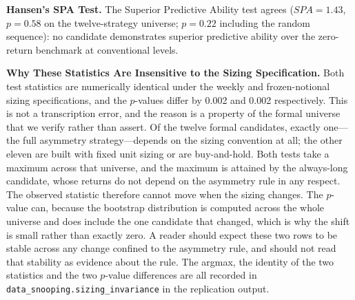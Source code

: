\documentclass[11pt]{article}
\begin{document}
\textbf{Hansen's SPA Test.} The Superior Predictive Ability test \citep{hansen2005test} agrees ($SPA = 1.43$, $p = 0.58$ on the twelve-strategy universe; $p = 0.22$ including the random sequence): no candidate demonstrates superior predictive ability over the zero-return benchmark at conventional levels.

\textbf{Why These Statistics Are Insensitive to the Sizing Specification.} Both test statistics are numerically identical under the weekly and frozen-notional sizing specifications, and the $p$-values differ by 0.002 and 0.002 respectively. This is not a transcription error, and the reason is a property of the formal universe that we verify rather than assert. Of the twelve formal candidates, exactly one---the full asymmetry strategy---depends on the sizing convention at all; the other eleven are built with fixed unit sizing or are buy-and-hold. Both tests take a maximum across that universe, and the maximum is attained by the always-long candidate, whose returns do not depend on the asymmetry rule in any respect. The observed statistic therefore cannot move when the sizing changes. The $p$-value can, because the bootstrap distribution is computed across the whole universe and does include the one candidate that changed, which is why the shift is small rather than exactly zero. A reader should expect these two rows to be stable across any change confined to the asymmetry rule, and should not read that stability as evidence about the rule. The argmax, the identity of the two statistics and the two $p$-value differences are all recorded in \texttt{data\_snooping.sizing\_invariance} in the replication output.
\end{document}
